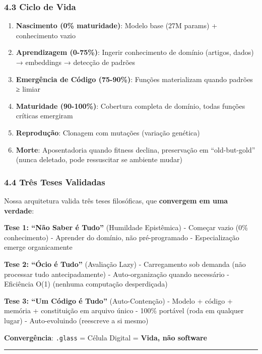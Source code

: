 \documentclass[
]{article}
\providecommand{\tightlist}{%
  \setlength{\itemsep}{0pt}\setlength{\parskip}{0pt}}
\begin{document}
\subsubsection{4.3 Ciclo de Vida}\label{ciclo-de-vida}

\begin{enumerate}
\def\labelenumi{\arabic{enumi}.}
\tightlist
\item
  \textbf{Nascimento (0\% maturidade)}: Modelo base (27M params) +
  conhecimento vazio
\item
  \textbf{Aprendizagem (0-75\%)}: Ingerir conhecimento de domínio
  (artigos, dados) → embeddings → detecção de padrões
\item
  \textbf{Emergência de Código (75-90\%)}: Funções materializam quando
  padrões ≥ limiar
\item
  \textbf{Maturidade (90-100\%)}: Cobertura completa de domínio, todas
  funções críticas emergiram
\item
  \textbf{Reprodução}: Clonagem com mutações (variação genética)
\item
  \textbf{Morte}: Aposentadoria quando fitness declina, preservação em
  ``old-but-gold'' (nunca deletado, pode ressuscitar se ambiente mudar)
\end{enumerate}

\subsubsection{4.4 Três Teses Validadas}\label{truxeas-teses-validadas}

Nossa arquitetura valida três teses filosóficas, que \textbf{convergem
em uma verdade}:

\textbf{Tese 1: ``Não Saber é Tudo''} (Humildade Epistêmica) - Começar
vazio (0\% conhecimento) - Aprender do domínio, não pré-programado -
Especialização emerge organicamente

\textbf{Tese 2: ``Ócio é Tudo''} (Avaliação Lazy) - Carregamento sob
demanda (não processar tudo antecipadamente) - Auto-organização quando
necessário - Eficiência O(1) (nenhuma computação desperdiçada)

\textbf{Tese 3: ``Um Código é Tudo''} (Auto-Contenção) - Modelo + código
+ memória + constituição em arquivo único - 100\% portável (roda em
qualquer lugar) - Auto-evoluindo (reescreve a si mesmo)

\textbf{Convergência}: \texttt{.glass} = Célula Digital = \textbf{Vida,
não software}

\begin{center}\rule{0.5\linewidth}{0.5pt}\end{center}
\end{document}
